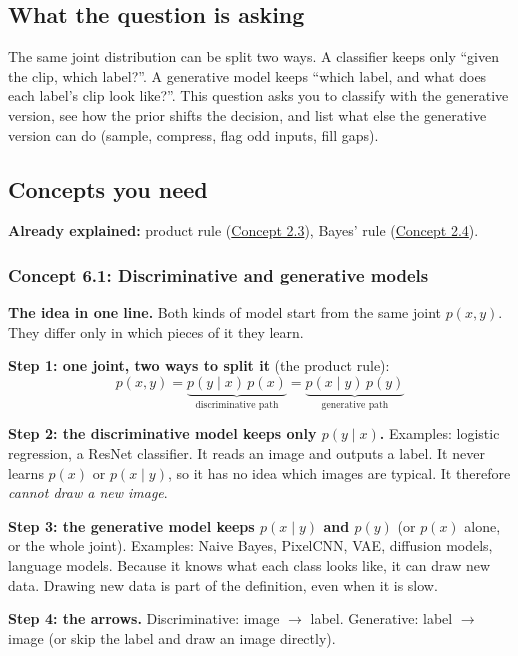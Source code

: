 \documentclass[12pt,a4paper]{article}
\begin{document}
\subsection{What the question is asking}

The same joint distribution can be split two ways. A classifier keeps only ``given the clip, which label?''. A generative model keeps ``which label, and what does each label's clip look like?''. This question asks you to classify with the generative version, see how the prior shifts the decision, and list what else the generative version can do (sample, compress, flag odd inputs, fill gaps).

\subsection{Concepts you need}

\textbf{Already explained:} product rule (\hyperref[c2-3]{Concept 2.3}), Bayes' rule (\hyperref[c2-4]{Concept 2.4}).

\subsubsection{Concept 6.1: Discriminative and generative models}\label{c6-1}

\textbf{The idea in one line.} Both kinds of model start from the same joint $p(x,y)$. They differ only in which pieces of it they learn.

\textbf{Step 1: one joint, two ways to split it} (the product rule):
\[
p(x,y)=\underbrace{p(y\mid x)\,p(x)}_{\text{discriminative path}}=\underbrace{p(x\mid y)\,p(y)}_{\text{generative path}}
\]

\textbf{Step 2: the discriminative model keeps only $p(y\mid x)$.} Examples: logistic regression, a ResNet classifier. It reads an image and outputs a label. It never learns $p(x)$ or $p(x\mid y)$, so it has no idea which images are typical. It therefore \emph{cannot draw a new image}.

\textbf{Step 3: the generative model keeps $p(x\mid y)$ and $p(y)$} (or $p(x)$ alone, or the whole joint). Examples: Naive Bayes, PixelCNN, VAE, diffusion models, language models. Because it knows what each class looks like, it can draw new data. Drawing new data is part of the definition, even when it is slow.

\textbf{Step 4: the arrows.} Discriminative: image $\to$ label. Generative: label $\to$ image (or skip the label and draw an image directly).
\end{document}

